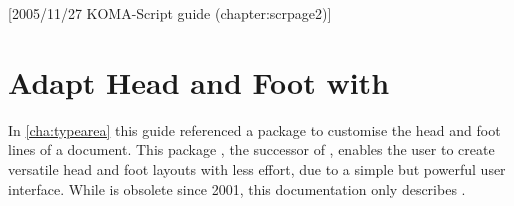 %
%
%
%
%
%
%
%
% 
%
%
%
%

[2005/11/27 KOMA-Script guide (chapter:scrpage2)]

\chapter{Adapt Head and Foot with }

%
%
%
In \autoref{cha:typearea} this guide referenced a package
to customise the head and foot lines of a document.
This package , the successor of ,
enables the user to create versatile head and foot layouts with
less effort, due to a simple but powerful user interface. While
 is obsolete since 2001, this documentation only describes
.

